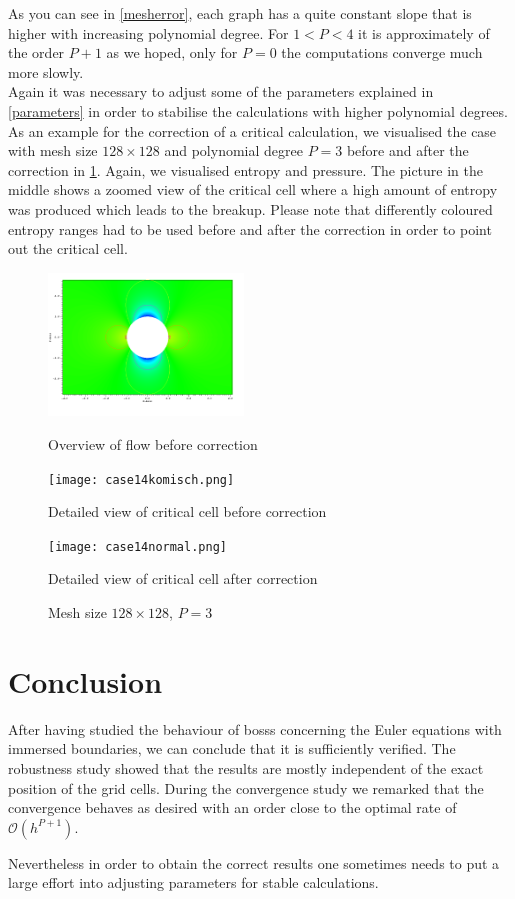 	As you can see in \cref{mesherror}, each graph has a quite constant slope that is higher with increasing polynomial degree. For $1 < P < 4$ it is approximately of the order $P+1$ as we hoped, only for $P = 0$ the computations converge much more slowly.\\ \indent
	Again it was necessary to adjust some of the parameters explained in \cref{parameters} in order to stabilise the calculations with higher polynomial degrees. \\ \indent
	\newpage
	As an example for the correction of a critical calculation, we visualised the case with mesh size $128 \times 128$ and polynomial degree $P = 3$ before and after the correction in \cref{fig:case14}. Again, we visualised entropy and pressure. The picture in the middle shows a zoomed view of the critical cell where a high amount of entropy was produced which leads to the breakup. Please note that differently coloured entropy ranges had to be used before and after the correction in order to point out the critical cell.
	\begin{figure}[htp]
		\centering
		\begin{minipage}[b]{0.3\textwidth}
			\centering
			\includegraphics[height=3.8cm]{img/case14.png}
			\caption*{Overview of flow before correction}
		\end{minipage}
		\quad
		\begin{minipage}[b]{0.3\textwidth}
			\centering
			\texttt{[image: case14komisch.png]}
			\caption*{Detailed view of critical cell before correction}
			\label{fig:case14detail}
		\end{minipage}
		\quad
		\begin{minipage}[b]{0.3\textwidth}
			\centering
			\texttt{[image: case14normal.png]}
			\caption*{Detailed view of critical cell after correction}
			\label{fig:case14detailneu}
		\end{minipage}
		\caption{Mesh size $128 \times 128$, $P = 3$}
		\label{fig:case14}
	\end{figure}
	
	\section{Conclusion}
	
	After having studied the behaviour of \gls{bosss} concerning the Euler equations with immersed boundaries, we can conclude that it is sufficiently verified. The robustness study showed that the results are mostly independent of the exact position of the grid cells. During the convergence study we remarked  that the convergence behaves as desired with an order close to the optimal rate of $\mathcal{O}(h^{P+1})$. 
	
	Nevertheless in order to obtain the correct results one sometimes needs to put a large effort into adjusting parameters for stable calculations. 